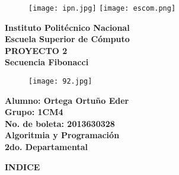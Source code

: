 \documentclass[letterpaper]{article}
\begin{document}
\pagestyle{empty}

\begin{figure}
	\texttt{[image: ipn.jpg]}
	\hspace{12.5cm}
	\texttt{[image: escom.png]}
\end{figure}

\begin{center}
\textbf{\LARGE Instituto Polit\'ecnico Nacional\\} %
\textbf{\Large Escuela Superior de C\'omputo\\}
\vspace{0.9cm}
\textbf{\LARGE PROYECTO 2\\}
\textbf{\Large Secuencia Fibonacci\\}
\vspace{0.5cm}
\end{center}

\begin{center}
\begin{figure}[H] %
	\hspace{3cm}\texttt{[image: 92.jpg]}
\end{figure}
\end{center}

\begin{center}
\textbf{\Large Alumno: Ortega Ortu\~no Eder\\} %
\textbf{\Large Grupo: 1CM4\\}
\textbf{\Large No. de boleta: 2013630328\\}
\vspace{0.9cm}
\textbf{\LARGE Algoritmia y Programaci\'on\\}
\textbf{\Large 2do. Departamental\\}
\end{center}

\clearpage

\begin{center}
\textbf{\LARGE INDICE\\}
\vspace{1.5cm}
\end{center}
\end{document}
